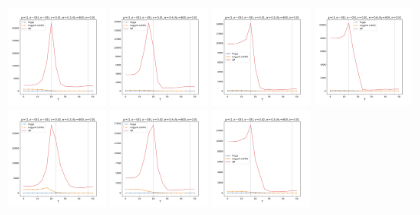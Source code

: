 \documentclass[a4paper]{article}
\begin{document}
\begin{figure}[H]
  \centering
  \includegraphics[width=0.23\textwidth]{grid-g4-v1-w1_0}
  \includegraphics[width=0.23\textwidth]{grid-g4-v1-w2_0}
  \includegraphics[width=0.23\textwidth]{grid-g4-v1-w3_0}
  \includegraphics[width=0.23\textwidth]{grid-g4-v1-w4_0}
  \\
  \includegraphics[width=0.23\textwidth]{grid-g4-v2-w1_0}
  \includegraphics[width=0.23\textwidth]{grid-g4-v2-w2_0}
  \includegraphics[width=0.23\textwidth]{grid-g4-v2-w3_0}

\end{figure}
\end{document}
